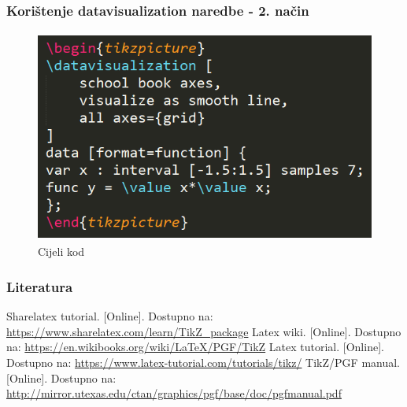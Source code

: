 \documentclass{beamer}
\begin{document}
	\begin{frame}
	\frametitle{Korištenje datavisualization naredbe - 2. način}
		\begin{figure}
			\begin{center}
				\includegraphics[width=12 cm,height=7cm]{graf_2_2_kod.png}
				\caption{Cijeli kod}
			\end{center}
		\end{figure}
	\end{frame}

\begin{frame}
	\frametitle{Literatura}	
	
	\begin{thebibliography}{9}
	\beamertemplatetextbibitems
	 Sharelatex tutorial. [Online]. Dostupno na: \url{https://www.sharelatex.com/learn/TikZ_package}
	 Latex wiki. [Online]. Dostupno na: \url{https://en.wikibooks.org/wiki/LaTeX/PGF/TikZ}
	 Latex tutorial. [Online]. Dostupno na: \url{https://www.latex-tutorial.com/tutorials/tikz/}
	 TikZ/PGF manual. [Online]. Dostupno na: \url{http://mirror.utexas.edu/ctan/graphics/pgf/base/doc/pgfmanual.pdf}	
	\end{thebibliography}

\end{frame}
\end{document}
